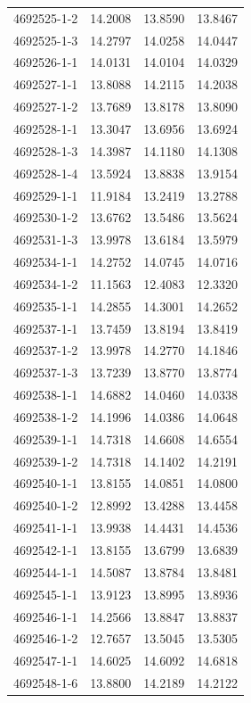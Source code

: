 \begin{longtable}{lrrr}
4692525-1-2 & 14.2008 & 13.8590 & 13.8467 \\
4692525-1-3 & 14.2797 & 14.0258 & 14.0447 \\
4692526-1-1 & 14.0131 & 14.0104 & 14.0329 \\
4692527-1-1 & 13.8088 & 14.2115 & 14.2038 \\
4692527-1-2 & 13.7689 & 13.8178 & 13.8090 \\
4692528-1-1 & 13.3047 & 13.6956 & 13.6924 \\
4692528-1-3 & 14.3987 & 14.1180 & 14.1308 \\
4692528-1-4 & 13.5924 & 13.8838 & 13.9154 \\
4692529-1-1 & 11.9184 & 13.2419 & 13.2788 \\
4692530-1-2 & 13.6762 & 13.5486 & 13.5624 \\
4692531-1-3 & 13.9978 & 13.6184 & 13.5979 \\
4692534-1-1 & 14.2752 & 14.0745 & 14.0716 \\
4692534-1-2 & 11.1563 & 12.4083 & 12.3320 \\
4692535-1-1 & 14.2855 & 14.3001 & 14.2652 \\
4692537-1-1 & 13.7459 & 13.8194 & 13.8419 \\
4692537-1-2 & 13.9978 & 14.2770 & 14.1846 \\
4692537-1-3 & 13.7239 & 13.8770 & 13.8774 \\
4692538-1-1 & 14.6882 & 14.0460 & 14.0338 \\
4692538-1-2 & 14.1996 & 14.0386 & 14.0648 \\
4692539-1-1 & 14.7318 & 14.6608 & 14.6554 \\
4692539-1-2 & 14.7318 & 14.1402 & 14.2191 \\
4692540-1-1 & 13.8155 & 14.0851 & 14.0800 \\
4692540-1-2 & 12.8992 & 13.4288 & 13.4458 \\
4692541-1-1 & 13.9938 & 14.4431 & 14.4536 \\
4692542-1-1 & 13.8155 & 13.6799 & 13.6839 \\
4692544-1-1 & 14.5087 & 13.8784 & 13.8481 \\
4692545-1-1 & 13.9123 & 13.8995 & 13.8936 \\
4692546-1-1 & 14.2566 & 13.8847 & 13.8837 \\
4692546-1-2 & 12.7657 & 13.5045 & 13.5305 \\
4692547-1-1 & 14.6025 & 14.6092 & 14.6818 \\
4692548-1-6 & 13.8800 & 14.2189 & 14.2122 \\

\end{longtable}
